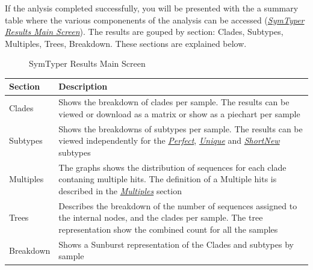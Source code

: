 \documentclass[letterpaper,10pt,english]{sphinxmanual}
\begin{document}
If the anlysis completed successfully, you will be presented with
the a summary table where the various componenents of the analysis
can be accessed ({\hyperref[Web:main-results-page]{\emph{SymTyper Results Main Screen}}}). The results are gouped by section: Clades, Subtypes, Multiples, Trees, Breakdown. These sections are explained below.
\begin{figure}[htbp]
\centering
\capstart

\caption{SymTyper Results Main Screen}\label{Web:main-results-page}\end{figure}

\begin{tabulary}{\linewidth}{|p{2cm}|p{13cm}|}
\hline
\textsf{\relax 
Section
} & \textsf{\relax 
Description
}\\
\hline
Clades
 & 
Shows the breakdown of clades per sample. The results can be viewed or download as a matrix or show as a piechart per sample
\\

Subtypes
 & 
Shows the breakdowns of subtypes per sample. The results can be viewed independently for the {\hyperref[defs:perfect]{\emph{Perfect}}}, {\hyperref[defs:unique]{\emph{Unique}}} and  {\hyperref[defs:shortnew]{\emph{ShortNew}}} subtypes
\\

Multiples
 & 
The graphs shows the distribution of sequences for each clade contaning multiple hits. The definition of a Multiple hits is described in the {\hyperref[defs:multiples]{\emph{Multiples}}} section
\\

Trees
 & 
Describes the breakdown of the number of sequences assigned to the internal nodes, and the clades per sample. The tree representation show the combined count for all the samples
\\

Breakdown
 & 
Shows a Sunburst representation of the Clades and subtypes by sample
\\
\hline\end{tabulary}
\end{document}
